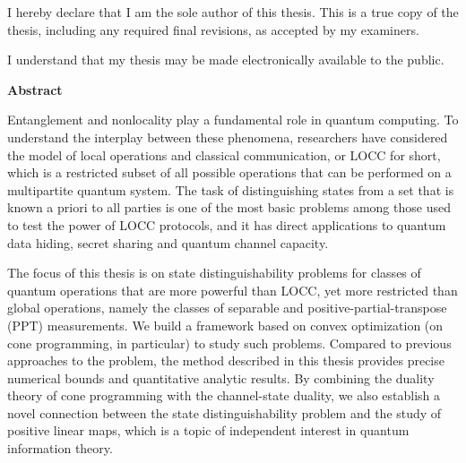 \pagestyle{plain}
\setcounter{page}{2}

\cleardoublepage %
 


  \noindent
I hereby declare that I am the sole author of this thesis. This is a true copy of the thesis, including any required final revisions, as accepted by my examiners.

  \bigskip
  
  \noindent
I understand that my thesis may be made electronically available to the public.

\cleardoublepage


\begin{center}\textbf{Abstract}\end{center}

Entanglement and nonlocality play a fundamental role in quantum computing.
To understand the interplay between these phenomena, researchers have considered the 
model of local operations and classical communication, or LOCC for short,
which is a restricted subset of all possible operations 
that can be performed on a multipartite quantum system.
The task of distinguishing states from a set that is known a priori to all parties
is one of the most basic problems among those used to test the power of LOCC protocols,
and it has direct applications to quantum data hiding, secret sharing and quantum channel capacity.

The focus of this thesis is on state distinguishability problems for 
classes of quantum operations that are more powerful than LOCC, 
yet more restricted than global operations, namely the 
classes of separable and positive-partial-transpose (PPT) measurements. 
We build a framework based on convex optimization (on cone programming, in particular) 
to study such problems.
Compared to previous approaches to the problem,
the method described in this thesis provides precise numerical bounds and quantitative analytic results.
By combining the duality theory of cone programming with the channel-state duality, 
we also establish a novel connection between the state distinguishability problem 
and the study of positive linear maps, which is a topic of independent interest in quantum information theory.

